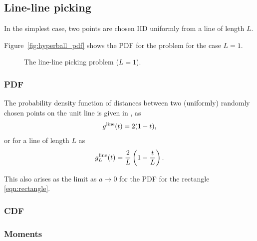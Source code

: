 \subsection{Line-line picking}
\label{sec:line_line}

In the simplest case, two points are chosen IID uniformly from a line
of length $L$. 

Figure~\ref{fig:hyperball_pdf} shows the PDF for the problem for the
case $L=1$.

\begin{figure}[tbp]
  \begin{center}
    \caption{The line-line picking problem ($L=1$).}
  \end{center} 
\vspace{-4mm}
\end{figure}

\subsubsection{PDF}

The probability density function of distances between two (uniformly)
randomly chosen points on the unit line is given in
\cite{weisstein:_line_line_picking,b.ghosh51:_random_rect}, as
\begin{equation}
  \label{eq:line_line}
  g^{\rm line}(t) = 2(1-t),
\end{equation}
or for a line of length $L$ as
\begin{equation}
  \label{eq:line_lineL}
  g^{\rm line}_L(t) = \frac{2}{L} \left( 1-\frac{t}{L} \right).
\end{equation}

This also arises as the limit as $a \rightarrow 0$ for the PDF for the
rectangle \eqref{eqn:rectangle}.

\subsubsection{CDF}


\subsubsection{Moments}




